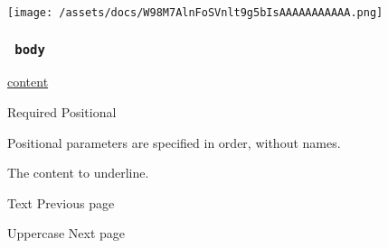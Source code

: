 \texttt{[image: /assets/docs/W98M7AlnFoSVnlt9g5bIsAAAAAAAAAAA.png]}

\subsubsection{\texorpdfstring{\texttt{\ body\ }}{ body }}\label{parameters-body}

\href{/docs/reference/foundations/content/}{content}

{Required} {{ Positional }}

\label{parameters-body-positional-tooltip}
Positional parameters are specified in order, without names.

The content to underline.

\href{/docs/reference/text/text/}{\pandocbounded{}}

{ Text } { Previous page }

\href{/docs/reference/text/upper/}{\pandocbounded{}}

{ Uppercase } { Next page }
